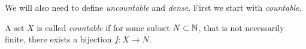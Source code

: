 {%

        
    

  

We will also need to define \textit{uncountable} and \textit{dense}.  First we start with \textit{countable}.

\begin{definition}[Countable]
    A set $X$ is called \textit{countable} if for some  subset $N \subset \mathbb{N}$, that is not necessarily finite, there exists a bijection $f: X \to N$.  
\end{definition}

}
